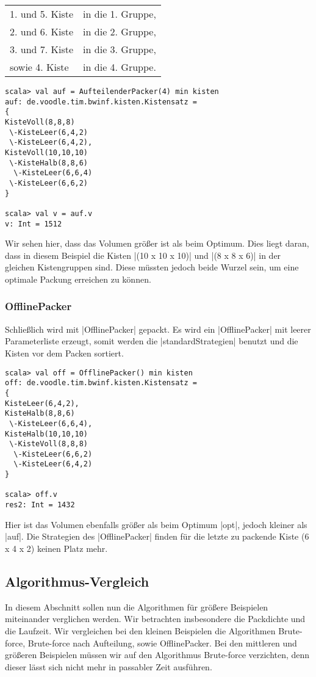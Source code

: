 \begin{tabular}{ll}
 1. und 5. Kiste & in die 1. Gruppe, \\
 2. und 6. Kiste & in die 2. Gruppe, \\
 3. und 7. Kiste & in die 3. Gruppe, \\
  sowie 4. Kiste & in die 4. Gruppe. \\
\end{tabular}

\begin{lstlisting}
scala> val auf = AufteilenderPacker(4) min kisten
auf: de.voodle.tim.bwinf.kisten.Kistensatz = 
{
KisteVoll(8,8,8)
 \-KisteLeer(6,4,2)
 \-KisteLeer(6,4,2),
KisteVoll(10,10,10)
 \-KisteHalb(8,8,6)
  \-KisteLeer(6,6,4)
 \-KisteLeer(6,6,2)
}

scala> val v = auf.v
v: Int = 1512
\end{lstlisting}
 Wir sehen hier, dass das Volumen größer ist als beim Optimum.
 Dies liegt daran, dass in diesem Beispiel die Kisten |(10 x 10 x 10)| und |(8 x 8 x 6)| in der gleichen Kistengruppen sind.
 Diese müssten jedoch beide Wurzel sein, um eine optimale Packung erreichen zu können.

\subsubsection*{OfflinePacker}
 Schließlich wird mit |OfflinePacker| gepackt.
 Es wird ein |OfflinePacker| mit leerer Parameterliste erzeugt, somit werden die |standardStrategien| benutzt und die Kisten vor dem Packen sortiert.
\begin{lstlisting}
scala> val off = OfflinePacker() min kisten
off: de.voodle.tim.bwinf.kisten.Kistensatz = 
{
KisteLeer(6,4,2),
KisteHalb(8,8,6)
 \-KisteLeer(6,6,4),
KisteHalb(10,10,10)
 \-KisteVoll(8,8,8)
  \-KisteLeer(6,6,2)
  \-KisteLeer(6,4,2)
}

scala> off.v
res2: Int = 1432

\end{lstlisting}
 Hier ist das Volumen ebenfalls größer als beim Optimum |opt|, jedoch kleiner als |auf|.
 Die Strategien des |OfflinePacker| finden für die letzte zu packende Kiste (6 x 4 x 2) keinen Platz mehr.

\subsection{Algorithmus-Vergleich}
\label{algcont}
 In diesem Abschnitt sollen nun die Algorithmen für größere Beispielen miteinander verglichen werden.
 Wir betrachten insbesondere die Packdichte und die Laufzeit.
 Wir vergleichen bei den kleinen Beispielen die Algorithmen Brute-force, Brute-force nach Aufteilung, sowie OfflinePacker.
 Bei den mittleren und größeren Beispielen müssen wir auf den Algorithmus Brute-force verzichten, denn dieser lässt sich nicht mehr in passabler Zeit ausführen.
